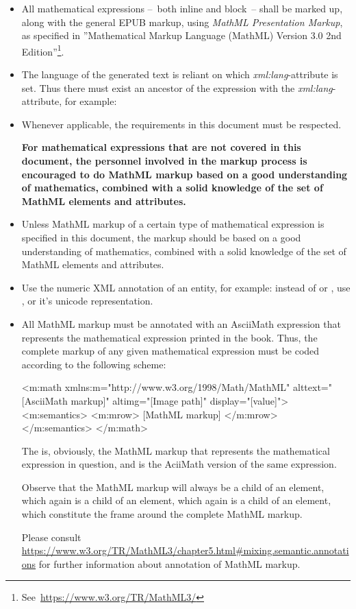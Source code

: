 \documentclass[english,a4paper,11pt]{article}
\begin{document}
\begin{itemize}
	\item All mathematical expressions --~both inline and block~-- shall be marked up, along with the general EPUB markup, using \emph{MathML Presentation Markup}, as specified in ''Mathematical Markup Language (MathML) Version 3.0 2nd Edition''\footnote{See~\url{https://www.w3.org/TR/MathML3/}}.
	\item The language of the generated text is reliant on which \emph{xml:lang}-attribute is set. Thus there must exist an ancestor of the expression with the \emph{xml:lang}-attribute, for example: 
	\item Whenever applicable, the requirements in this document must be respected.
	
	\textbf{For mathematical expressions that are not covered in this document, the personnel involved in the markup process is encouraged to do MathML markup based on a good understanding of mathematics, combined with a solid knowledge of the set of MathML elements and attributes.}

	\item Unless MathML markup of a certain type of mathematical expression is specified in this document, the markup should be based on a good understanding of mathematics, combined with a solid knowledge of the set of MathML elements and attributes.
	\item Use the numeric XML annotation of an entity, for example: instead of  or , use , or it's unicode representation.
	\item All MathML markup must be annotated with an AsciiMath expression that represents the mathematical expression printed in the book. Thus, the complete markup of any given mathematical expression must be coded according to the following scheme:
	
\begin{kodeblokk}
\begin{verbatimtab}[3]
<m:math xmlns:m="http://www.w3.org/1998/Math/MathML"
	   alttext="[AsciiMath markup]" 
	   altimg="[Image path]" 
	   display="[value]">
	<m:semantics>
		<m:mrow>
			[MathML markup]
		</m:mrow>
	</m:semantics>
</m:math>
\end{verbatimtab}
\end{kodeblokk}
The  is, obviously, the MathML markup that represents the mathematical expression in question, and  is the AciiMath version of the same expression.

Observe that the MathML markup will always be a child of an  element, which again is a child of an  element, which again is a child of an  element, which constitute the frame around the complete MathML markup.

\bigskip
Please consult \url{https://www.w3.org/TR/MathML3/chapter5.html#mixing.semantic.annotations} for further information about annotation of MathML markup.
\end{itemize}
\end{document}
